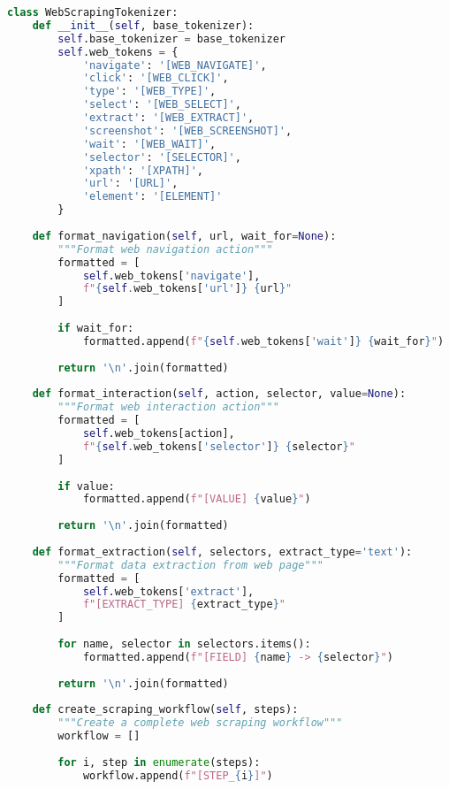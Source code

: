 \begin{lstlisting}[language=Python, caption=Web scraping and browser automation tokens]
class WebScrapingTokenizer:
    def __init__(self, base_tokenizer):
        self.base_tokenizer = base_tokenizer
        self.web_tokens = {
            'navigate': '[WEB_NAVIGATE]',
            'click': '[WEB_CLICK]',
            'type': '[WEB_TYPE]',
            'select': '[WEB_SELECT]',
            'extract': '[WEB_EXTRACT]',
            'screenshot': '[WEB_SCREENSHOT]',
            'wait': '[WEB_WAIT]',
            'selector': '[SELECTOR]',
            'xpath': '[XPATH]',
            'url': '[URL]',
            'element': '[ELEMENT]'
        }
        
    def format_navigation(self, url, wait_for=None):
        """Format web navigation action"""
        formatted = [
            self.web_tokens['navigate'],
            f"{self.web_tokens['url']} {url}"
        ]
        
        if wait_for:
            formatted.append(f"{self.web_tokens['wait']} {wait_for}")
        
        return '\n'.join(formatted)
    
    def format_interaction(self, action, selector, value=None):
        """Format web interaction action"""
        formatted = [
            self.web_tokens[action],
            f"{self.web_tokens['selector']} {selector}"
        ]
        
        if value:
            formatted.append(f"[VALUE] {value}")
        
        return '\n'.join(formatted)
    
    def format_extraction(self, selectors, extract_type='text'):
        """Format data extraction from web page"""
        formatted = [
            self.web_tokens['extract'],
            f"[EXTRACT_TYPE] {extract_type}"
        ]
        
        for name, selector in selectors.items():
            formatted.append(f"[FIELD] {name} -> {selector}")
        
        return '\n'.join(formatted)
    
    def create_scraping_workflow(self, steps):
        """Create a complete web scraping workflow"""
        workflow = []
        
        for i, step in enumerate(steps):
            workflow.append(f"[STEP_{i}]")
            

\end{lstlisting}
